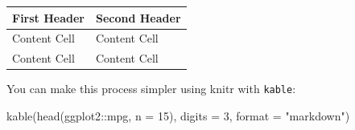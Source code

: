 \documentclass[
]{article}
\newenvironment{Shaded}{\begin{snugshade}}{\end{snugshade}}
\newcommand{\AttributeTok}[1]{\textcolor[rgb]{0.77,0.63,0.00}{#1}}
\newcommand{\DecValTok}[1]{\textcolor[rgb]{0.00,0.00,0.81}{#1}}
\newcommand{\FunctionTok}[1]{\textcolor[rgb]{0.00,0.00,0.00}{#1}}
\newcommand{\NormalTok}[1]{#1}
\newcommand{\SpecialCharTok}[1]{\textcolor[rgb]{0.00,0.00,0.00}{#1}}
\newcommand{\StringTok}[1]{\textcolor[rgb]{0.31,0.60,0.02}{#1}}
\begin{document}
\begin{longtable}[]{@{}ll@{}}
\toprule()
First Header & Second Header \\
\midrule()
\endhead
Content Cell & Content Cell \\
Content Cell & Content Cell \\
\bottomrule()
\end{longtable}

You can make this process simpler using knitr with \texttt{kable}:

\begin{Shaded}
\begin{Highlighting}[]
\FunctionTok{kable}\NormalTok{(}\FunctionTok{head}\NormalTok{(ggplot2}\SpecialCharTok{::}\NormalTok{mpg, }\AttributeTok{n =} \DecValTok{15}\NormalTok{), }\AttributeTok{digits =} \DecValTok{3}\NormalTok{, }\AttributeTok{format =} \StringTok{"markdown"}\NormalTok{)}
\end{Highlighting}
\end{Shaded}
\end{document}
